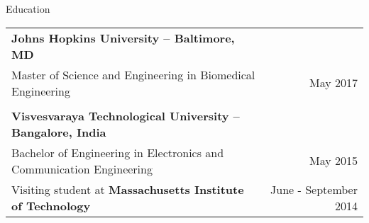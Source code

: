 \documentclass{resume}
\begin{document}
\thispagestyle{empty}
  \begin{rSection}{Education}
\begin{tabular*}{\textwidth}{@{\extracolsep{\fill}}lr@{}}
\textbf{\large Johns Hopkins University -- Baltimore, MD} &  \\
{Master of Science and Engineering in Biomedical Engineering} & May 2017 \\
\\
\textbf{\large Visvesvaraya Technological University -- Bangalore, India} & \\
{Bachelor of Engineering in Electronics and Communication Engineering} & May 2015 \\
Visiting student at \textbf{Massachusetts Institute of Technology} & June - September 2014
\end{tabular*}
  \end{rSection}
\end{document}
